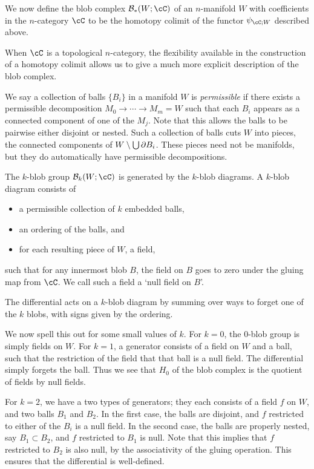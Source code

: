 \documentclass{pnastwo}
\begin{document}
\begin{article}
We now define the blob complex $\bc_*(W; \cC)$ of an $n$-manifold $W$
with coefficients in the $n$-category $\cC$ to be the homotopy colimit
of the functor $\psi_{\cC; W}$ described above. 

When $\cC$ is a topological $n$-category,
the flexibility available in the construction of a homotopy colimit allows
us to give a much more explicit description of the blob complex.

We say a collection of balls $\{B_i\}$ in a manifold $W$ is \emph{permissible}
if there exists a permissible decomposition $M_0\to\cdots\to M_m = W$ such that
each $B_i$ appears as a connected component of one of the $M_j$. Note that this allows the balls to be pairwise either disjoint or nested. Such a collection of balls cuts $W$ into pieces, the connected components of $W \setminus \bigcup \partial B_i$. These pieces need not be manifolds, but they do automatically have permissible decompositions.

The $k$-blob group $\bc_k(W; \cC)$ is generated by the $k$-blob diagrams. A $k$-blob diagram consists of
\begin{itemize}
\item a permissible collection of $k$ embedded balls,
\item an ordering of the balls, and
\item for each resulting piece of $W$, a field,
\end{itemize}
such that for any innermost blob $B$, the field on $B$ goes to zero under the gluing map from $\cC$. We call such a field a `null field on $B$'.

The differential acts on a $k$-blob diagram by summing over ways to forget one of the $k$ blobs, with signs given by the ordering.


We now spell this out for some small values of $k$. For $k=0$, the $0$-blob group is simply fields on $W$. For $k=1$, a generator consists of a field on $W$ and a ball, such that the restriction of the field that that ball is a null field. The differential simply forgets the ball. Thus we see that $H_0$ of the blob complex is the quotient of fields by null fields.

For $k=2$, we have a two types of generators; they each consists of a field $f$ on $W$, and two balls $B_1$ and $B_2$. In the first case, the balls are disjoint, and $f$ restricted to either of the $B_i$ is a null field. In the second case, the balls are properly nested, say $B_1 \subset B_2$, and $f$ restricted to $B_1$ is null. Note that this implies that $f$ restricted to $B_2$ is also null, by the associativity of the gluing operation. This ensures that the differential is well-defined.


\end{article}
\end{document}
